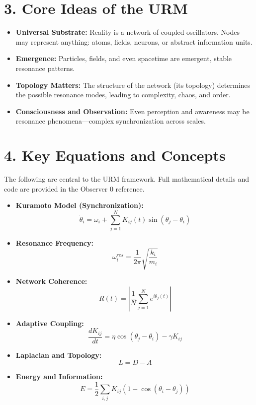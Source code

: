 \documentclass{article}
\begin{document}
\section*{3. Core Ideas of the URM}

\begin{itemize}
    \item \textbf{Universal Substrate:} Reality is a network of coupled oscillators. Nodes may represent anything: atoms, fields, neurons, or abstract information units.
    \item \textbf{Emergence:} Particles, fields, and even spacetime are emergent, stable resonance patterns.
    \item \textbf{Topology Matters:} The structure of the network (its topology) determines the possible resonance modes, leading to complexity, chaos, and order.
    \item \textbf{Consciousness and Observation:} Even perception and awareness may be resonance phenomena—complex synchronization across scales.
\end{itemize}

\section*{4. Key Equations and Concepts}

The following are central to the URM framework. Full mathematical details and code are provided in the Observer 0 reference.

\begin{itemize}
    \item \textbf{Kuramoto Model (Synchronization):}
    \[
    \dot{\theta}_i = \omega_i + \sum_{j=1}^N K_{ij}(t) \sin(\theta_j - \theta_i)
    \]
    \item \textbf{Resonance Frequency:}
    \[
    \omega_i^{res} = \frac{1}{2\pi} \sqrt{\frac{k_i}{m_i}}
    \]
    \item \textbf{Network Coherence:}
    \[
    R(t) = \left| \frac{1}{N} \sum_{j=1}^N e^{i \theta_j(t)} \right|
    \]
    \item \textbf{Adaptive Coupling:}
    \[
    \frac{dK_{ij}}{dt} = \eta \cos(\theta_j - \theta_i) - \gamma K_{ij}
    \]
    \item \textbf{Laplacian and Topology:}
    \[
    L = D - A
    \]
    \item \textbf{Energy and Information:}
    \[
    E = \frac{1}{2} \sum_{i,j} K_{ij} (1 - \cos(\theta_i - \theta_j))
    \]
\end{itemize}
\end{document}
